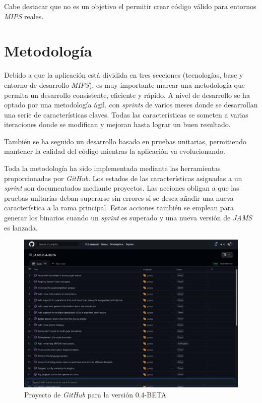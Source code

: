 \noindent Cabe destacar que no es un objetivo el permitir crear código válido para
entornos \textit{MIPS} reales.

\section{Metodología}\label{sec:metodologia}

Debido a que la aplicación está dividida en tres secciones (tecnologías, base y entorno de desarrollo \textit{MIPS}),
es muy importante marcar una metodología que permita un desarrollo consistente, eficiente y rápido.
A nivel de desarrollo se ha optado por una metodología ágil, con \textit{sprints} de varios meses
donde se desarrollan una serie de características claves.
Todas las características se someten a varias iteraciones donde se modifican y mejoran hasta lograr un
buen resultado.

\noindent También se ha seguido un desarrollo basado en pruebas unitarias,
permitiendo mantener la calidad del código mientras la aplicación va evolucionando.

\noindent Toda la metodología ha sido implementada mediante las herramientas proporcionadas por \textit{GitHub}.
Los estados de las características asignadas a un \textit{sprint} son documentados mediante proyectos.
Las acciones obligan a que las pruebas unitarias deban superarse sin errores si se desea añadir una nueva
característica a la rama principal.
Estas acciones también se emplean para generar los binarios cuando un \textit{sprint} es superado y una
nueva versión de \textit{JAMS} es lanzada.

\begin{figure}[H]
    \centering
    \includegraphics[width=\textwidth]{images/introduction/github}
    \caption{Proyecto de \textit{GitHub} para la versión 0.4-BETA}
    \label{fig:introduccion-github}
\end{figure}